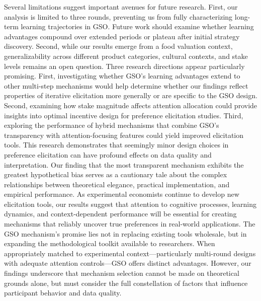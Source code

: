 \documentclass[12pt]{article}
\begin{document}
Several limitations suggest important avenues for future research. First, our analysis is limited to three rounds, preventing us from fully characterizing long-term learning trajectories in GSO. Future work should examine whether learning advantages compound over extended periods or plateau after initial strategy discovery. Second, while our results emerge from a food valuation context, generalizability across different product categories, cultural contexts, and stake levels remains an open question.
Three research directions appear particularly promising. First, investigating whether GSO's learning advantages extend to other multi-step mechanisms would help determine whether our findings reflect properties of iterative elicitation more generally or are specific to the GSO design. Second, examining how stake magnitude affects attention allocation could provide insights into optimal incentive design for preference elicitation studies. Third, exploring the performance of hybrid mechanisms that combine GSO's transparency with attention-focusing features could yield improved elicitation tools.
This research demonstrates that seemingly minor design choices in preference elicitation can have profound effects on data quality and interpretation. Our finding that the most transparent mechanism exhibits the greatest hypothetical bias serves as a cautionary tale about the complex relationships between theoretical elegance, practical implementation, and empirical performance.
 As experimental economists continue to develop new elicitation tools, our results suggest that attention to cognitive processes, learning dynamics, and context-dependent performance will be essential for creating mechanisms that reliably uncover true preferences in real-world applications.
The GSO mechanism's promise lies not in replacing existing tools wholesale, but in expanding the methodological toolkit available to researchers. When appropriately matched to experimental context—particularly multi-round designs with adequate attention controls—GSO offers distinct advantages. However, our findings underscore that mechanism selection cannot be made on theoretical grounds alone, but must consider the full constellation of factors that influence participant behavior and data quality.





\newpage
	\singlespacing
	\appendix
	\setcounter{table}{0}
	\setcounter{figure}{0}
	\renewcommand{\thetable}{A\arabic{table}}
	\renewcommand{\thefigure}{A\arabic{figure}}
	\setcounter{page}{1}
	\renewcommand{\thesubsection}{\Alph{subsection}}
\end{document}
